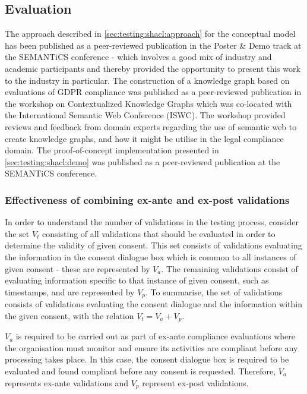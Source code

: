 \subsection{Evaluation}
The approach described in \autoref{sec:testing:shacl:approach} for the conceptual model has been published as a peer-reviewed publication \cite{pandit_exploring_2018} in the Poster \& Demo track at the SEMANTiCS conference - which involves a good mix of industry and academic participants and thereby provided the opportunity to present this work to the industry in particular. 
The construction of a knowledge graph based on evaluations of GDPR compliance was published as a peer-reviewed publication \cite{pandit_towards_2018} in the workshop on Contextualized Knowledge Graphs which was co-located with the International Semantic Web Conference (ISWC). The workshop provided reviews and feedback from domain experts regarding the use of semantic web to create knowledge graphs, and how it might be utilise in the legal compliance domain. 
The proof-of-concept implementation presented in \autoref{sec:testing:shacl:demo} was published as a peer-reviewed publication \cite{pandit_test-driven_2019} at the SEMANTiCS conference.

\subsubsection*{Effectiveness of combining ex-ante and ex-post validations}
In order to understand the number of validations in the testing process, consider the set $V_{t}$ consisting of all validations that should be evaluated in order to determine the validity of given consent. This set consists of validations evaluating the information in the consent dialogue box which is common to all instances of given consent - these are represented by $V_{a}$. The remaining validations consist of evaluating information specific to that instance of given consent, such as timestamps, and are represented by $V_{p}$. 
To summarise, the set of validations consists of validations evaluating the consent dialogue and the information within the given consent, with the relation $V_{t} = V_{a} + V_{p}$.

$V_{a}$ is required to be carried out as part of ex-ante compliance evaluations where the organisation must monitor and ensure its activities are compliant before any processing takes place. In this case, the consent dialogue box is required to be evaluated and found compliant before any consent is requested. Therefore, $V_{a}$ represents ex-ante validations and $V_{p}$ represent ex-post validations.

